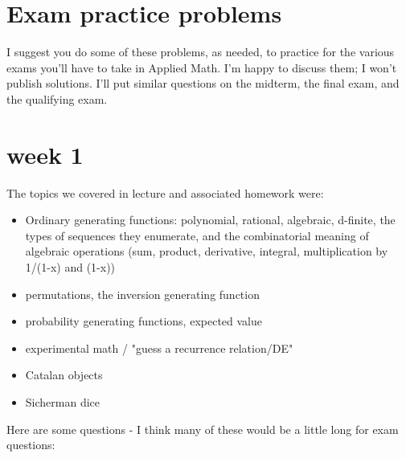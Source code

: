 \documentclass[12pt]{article}
\begin{document}
\section*{Exam practice problems}

I suggest you do some of these problems, as needed, to practice for the various exams you'll have to take in Applied Math.  I'm happy to discuss them; I won't publish solutions.  I'll put similar questions on the midterm, the final exam, and the qualifying exam.

\section{week 1}

The topics we covered in lecture and associated homework were:

\begin{itemize}
	\item Ordinary generating functions: polynomial, rational, algebraic, d-finite, the types of sequences they enumerate, and the combinatorial meaning of algebraic operations (sum, product, derivative, integral, multiplication by 1/(1-x) and (1-x))
	\item permutations, the inversion generating function
	\item probability generating functions, expected value
	\item experimental math / "guess a recurrence relation/DE"
	\item Catalan objects
	\item Sicherman dice
\end{itemize}

Here are some questions - I think many of these would be a little long for exam questions:
\end{document}
